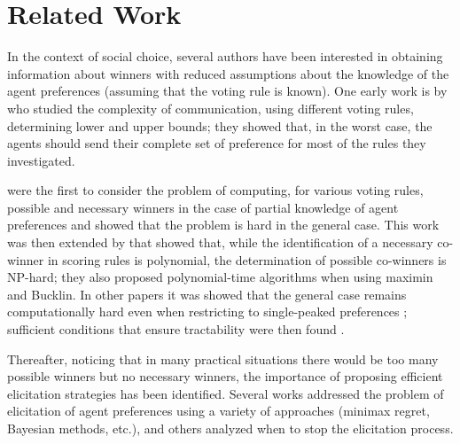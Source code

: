 \documentclass[sigconf, anonymous]{aamas}
\begin{document}
\section{Related Work}
\label{sec:related}
In the context of social choice, several authors have been interested in obtaining information about winners with reduced assumptions about the knowledge of the agent preferences (assuming that the voting rule is known). One early work is  by  who studied the complexity of communication, using different voting rules, determining lower and upper bounds; they showed that, in the worst case, the agents should send their complete set of preference for most of the rules they investigated. 

 were the first to consider the problem of computing, for various voting rules, possible and necessary winners in the case of partial knowledge of agent preferences and showed that the problem is hard in the general case.
This work was then extended by \citet{Xia2008} that showed that, while the identification of a necessary co-winner in scoring rules is polynomial,  the determination of possible co-winners is NP-hard; they also  proposed polynomial-time algorithms when using maximin and Bucklin.
In other papers it was showed that the general case remains computationally hard even when restricting to single-peaked preferences \citep{Walsh2007};  sufficient conditions that ensure tractability were then found \citep{Pini2007}.


Thereafter, noticing that in many practical situations there would be too many possible winners but no necessary winners, the importance of proposing efficient elicitation strategies has been identified. 
Several works addressed the problem of  elicitation of agent preferences \citep{Naamani-Dery2015,Kalech2011,Lu2011,Pini2009,Benabbou2016,Dey2016,Dey2016_2} using a variety of approaches (minimax regret, Bayesian methods, etc.), and others \citep{Walsh2009,Conitzer2009}  analyzed when to stop the elicitation process.
\end{document}
